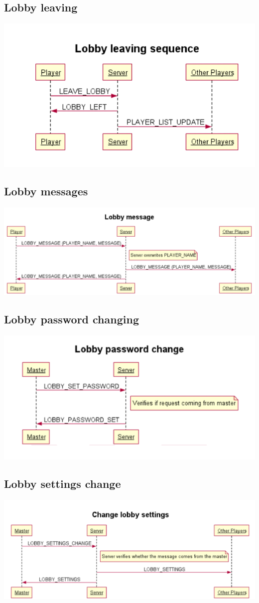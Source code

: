 \documentclass[12pt]{article}
\begin{document}
\subsection*{Lobby leaving}
\includegraphics[scale=0.5]{lobby-leave-sequence}
\subsection*{Lobby messages}
\includegraphics[scale=0.3]{lobby-message-sequence}
\subsection*{Lobby password changing}
\includegraphics[scale=0.5]{lobby-password-sequence}
\subsection*{Lobby settings change}
\includegraphics[scale=0.5]{lobby-settings-change-sequence}
\end{document}
